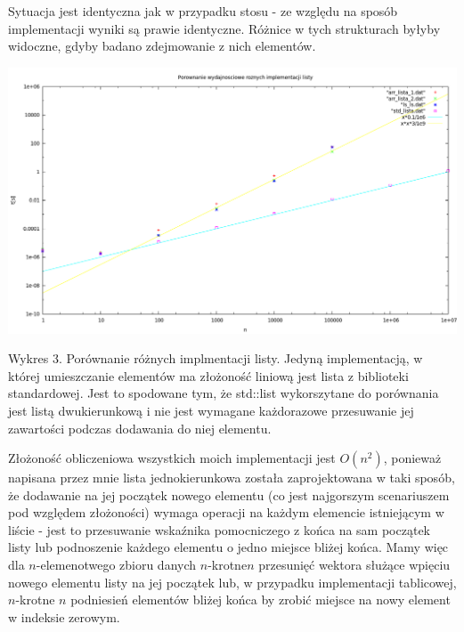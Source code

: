 Sytuacja jest identyczna jak w przypadku stosu - ze względu na sposób implementacji wyniki są prawie identyczne. Różnice w tych strukturach byłyby widoczne, gdyby badano zdejmowanie z nich elementów.
\newpage
\centerline{\includegraphics[width=\textwidth,height=\textheight, keepaspectratio]{lista.png}}
Wykres 3. Porównanie różnych implmentacji listy.
\newline
Jedyną implementacją, w której umieszczanie elementów ma złożoność liniową jest lista z biblioteki standardowej. Jest to spodowane tym, że std::list wykorszytane do porównania jest listą dwukierunkową i nie jest wymagane każdorazowe przesuwanie jej zawartości podczas dodawania do niej elementu.

Złożoność obliczeniowa wszystkich moich implementacji jest \begin{math}O(n^{2})\end{math}, ponieważ napisana przez mnie lista jednokierunkowa została zaprojektowana w taki sposób, że dodawanie na jej początek nowego elementu (co jest najgorszym scenariuszem pod względem złożoności) wymaga operacji na każdym elemencie istniejącym w liście - jest to przesuwanie wskaźnika pomocniczego z końca na sam początek listy lub podnoszenie każdego elementu o jedno miejsce bliżej końca. Mamy więc dla \begin{math}n\end{math}-elemenotwego zbioru danych \begin{math}n\end{math}-krotne\begin{math} n\end{math} przesunięć wektora służące wpięciu nowego elementu listy na jej początek lub, w przypadku implementacji tablicowej, \begin{math}n\end{math}-krotne \begin{math}n\end{math} podniesień elementów bliżej końca by zrobić miejsce na nowy element w indeksie zerowym. 
\newpage
